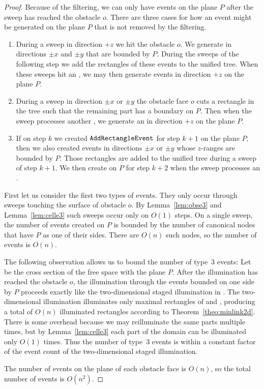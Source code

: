 \documentclass[english,gradu]{tktltiki2018}
\begin{document}
\begin{proof}
Because of the filtering, we can only have events on the plane $P$ after the sweep has reached the obstacle $o$.
There are three cases for how an event might be generated on the plane $P$ that is not removed by the filtering.
\begin{enumerate}
\item During a sweep in direction $+z$ we hit the obstacle $o$.
	We generate \addEs in directions $\pm x$ and $\pm y$ that are bounded by $P$.
	During the sweeps of the following step we add the rectangles of these events to the unified tree.
	When these sweeps hit an \obsE, we may then generate events in direction $+z$ on the plane $P$.
\item During a sweep in direction $\pm x$ or $\pm y$ the obstacle face $o$ cuts a rectangle in the tree such that the remaining part has a boundary on $P$.
	Then when the sweep processes another \obsE, we generate an \addE in direction $+z$ on the plane $P$.
\item If on step $k$ we created $\mathtt{AddRectangleEvent}$ for step $k+1$ on the plane $P$, then we also created events in directions $\pm x$ or $\pm y$ whose $z$-ranges are bounded by $P$.
	Those rectangles are added to the unified tree during a sweep of step $k+1$.
	We then create \addEs on $P$ for step $k+2$ when the sweep processes an \obsE.
\end{enumerate}

First let us consider the first two types of events.
They only occur through sweeps touching the surface of obstacle $o$.
By Lemma~\ref{lem:obse3} and Lemma~\ref{lem:celle3} such sweeps occur only on $O(1)$ steps.
On a single sweep, the number of events created on $P$ is bounded by the number of canonical nodes that have $P$ as one of their sides.
There are $O(n)$ such nodes, so the number of events is $O(n)$.

The following observation allows us to bound the number of type~3 events:
Let \fspaceb be the cross section of the free space \fspace with the plane $P$.
After the illumination has reached the obstacle $o$, the illumination through the events bounded on one side by $P$ proceeds exactly like the two-dimensional staged illumination in \fspaceb.
The two-dimensional illumination illuminates only maximal rectangles of  and , producing a total of $O(n)$ illuminated rectangles according to Theorem~\ref{theo:minlink2d}.
There is some overhead because we may reilluminate the same parts multiple times, but by Lemma~\ref{lem:celle3} each part of the domain can be illuminated only $O(1)$ times.
Thus the number of type~3 events is within a constant factor of the event count of the two-dimensional staged illumination.

The number of events on the plane of each obstacle face is $O(n)$, so the total number of events is $O(n^2)$.
\end{proof}
\end{document}
